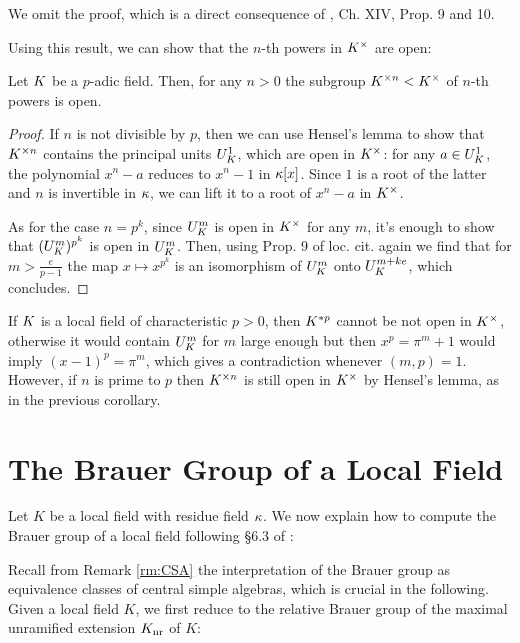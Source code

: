 \documentclass[a4paper, oneside]{memoir}
\begin{document}
We omit the proof, which is a direct consequence of \cite{SerreCL}, Ch. XIV, Prop. 9 and 10.

Using this result, we can show that the $n$-th powers in $K^\times$ are open:
\begin{corollary}\label{cor:KxOpen}
    Let $K$ be a $p$-adic field. Then, for any $n>0$ the subgroup $K^{\times n}<K^\times$ of $n$-th powers is open.
\end{corollary}
\begin{proof}
    If $n$ is not divisible by $p$, then we can use Hensel's lemma to show that $K^{\times n}$ contains the principal units $U_K^1$, which are open in $K^\times$: for any $a\in U_K^1$, the polynomial $x^n-a$ reduces to $x^{n} - 1$ in $\kappa[x]$. Since $1$ is a root of the latter and $n$ is invertible in $\kappa$, we can lift it to a root of $x^n-a$ in $K^\times$.

    As for the case $n=p^k$, since $U_K^m$ is open in $K^\times$ for any $m$, it's enough to show that $(U_K^m)^{p^k}$ is open in $U_K^m$.
    Then, using Prop. 9 of loc. cit. again we find that for $m>\frac{e}{p-1}$ the map $x\mapsto x^{p^k}$ is an isomorphism of $U_K^m$ onto $U_K^{m+ke}$, which concludes.
\end{proof}

\begin{remark}\label{rm:KxOpenCharP}
    If $K$ is a local field of characteristic $p>0$, then $K^{*p}$ cannot be not open in $K^\times$, otherwise it would contain $U_K^m$ for $m$ large enough but then $x^p = \pi^m + 1$ would imply $(x-1)^p = \pi^m$, which gives a contradiction whenever $(m,p)=1$.
    However, if $n$ is prime to $p$ then $K^{\times n}$ is still open in $K^\times$ by Hensel's lemma, as in the previous corollary.
\end{remark}

\section{The Brauer Group of a Local Field}

Let $K$ be a local field with residue field $\kappa$. We now explain how to compute the Brauer group of a local field following \S 6.3 of \cite{SzamuelyGille}:

Recall from Remark \ref{rm:CSA} the interpretation of the Brauer group as equivalence classes of central simple algebras, which is crucial in the following. Given a local field $K$, we first reduce to the relative Brauer group of the maximal unramified extension $K_{\text{nr}}$ of $K$:
\end{document}
